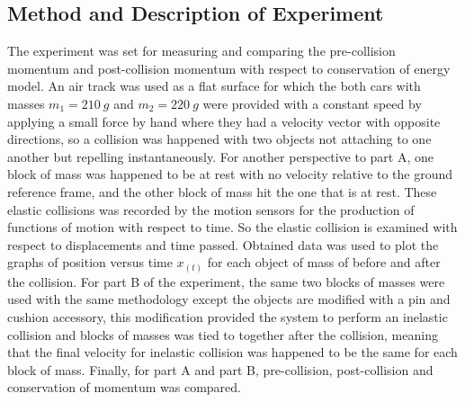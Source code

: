 \documentclass[a4paper, 12pt]{article}
\newcommand{\subhead}[1]{\subsection{\normalsize #1}}
\begin{document}
    \subhead{Method and Description of Experiment}
    The experiment was set for measuring and comparing the pre-collision momentum and post-collision 
    momentum with respect to conservation of energy model. An air track was used as a flat surface for 
    which the both cars with masses $m_1 = 210~g$ and $m_2 = 220~g$ were provided with a constant speed by 
    applying a small force by hand where they had a velocity vector with opposite directions, so a collision 
    was happened with two objects not attaching to one another but repelling instantaneously. For another 
    perspective to part A, one block of mass was happened to be at rest with no velocity relative to the 
    ground reference frame, and the other block of mass hit the one that is at rest. These elastic collisions 
    was recorded by the motion sensors for the production of functions of motion with respect to time. So 
    the elastic collision is examined with respect to displacements and time passed. Obtained data was used
    to plot the graphs of position versus time $x_{(t)}$ for each object of mass of before and after the collision.
    For part B of the experiment, the same two blocks of masses were used with the same methodology 
    except the objects are modified with a pin and cushion accessory, this modification provided the system
    to perform an inelastic collision and blocks of masses was tied to together after the collision, meaning 
    that the final velocity for inelastic collision was happened to be the same for each block of mass.
    Finally, for part A and part B, pre-collision, post-collision and conservation of momentum was 
    compared.
\end{document}
